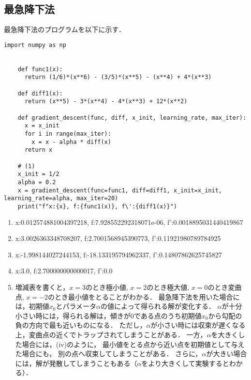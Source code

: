 \subsection{最急降下法}
  最急降下法のプログラムを以下に示す．
  \begin{lstlisting}[caption=Gradient descent,label=gd]
    import numpy as np


    def func1(x):
      return (1/6)*(x**6) - (3/5)*(x**5) - (x**4) + 4*(x**3)

    def diff1(x):
      return (x**5) - 3*(x**4) - 4*(x**3) + 12*(x**2)
    
    def gradient_descent(func, diff, x_init, learning_rate, max_iter):
      x = x_init
      for i in range(max_iter):
        x = x - alpha * diff(x)
      return x

    # (1)
    x_init = 1/2
    alpha = 0.2
    x = gradient_descent(func=func1, diff=diff1, x_init=x_init, learning_rate=alpha, max_iter=20)
    print("f"x:{x}, f:{func1(x)}, f\':{diff1(x)}")
  \end{lstlisting}

  \begin{enumerate}[label=(\roman*)]
    \item x:0.012574881004397218, f:7.928552292318071e-06, f':0.0018895031440419867
    \item x:3.0026363348708207, f:2.7001568945390773, f':0.11921980789784925
    \item x:-1.998144027244153, f:-18.133195794962337, f':0.14807862625745827
    \item x:3.0, f:2.700000000000017, f':0.0
    \item 増減表を書くと，$x=3$のとき極小値, $x=2$のとき極大値, $x=0$のとき変曲点, $x=-2$のとき最小値をとることがわかる．
      最急降下法を用いた場合には，初期値$x_0$とパラメータ$\alpha$の値によって得られる解が変化する．
      $\alpha$が十分小さい時には，得られる解は，傾きが$0$である点のうち初期値$x_0$から勾配の負の方向で最も近いものになる．
      ただし，$\alpha$が小さい時には収束が遅くなる上，変曲点の近くでトラップされてしまうことがある．
      一方，$\alpha$を大きくした場合には，(iv)のように，
      最小値をとる点から近い点を初期値として与えた場合にも，
      別の点へ収束してしまうことがある．
      さらに，$\alpha$が大きい場合には，解が発散してしまうこともある（$\alpha$をより大きくして実験するとわかる）．
  \end{enumerate}